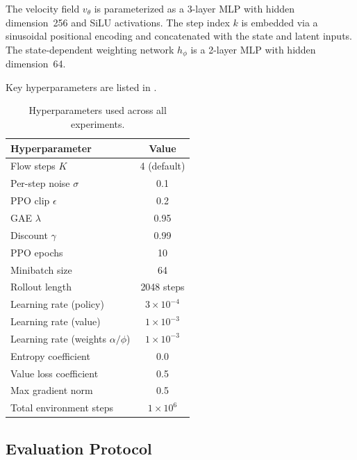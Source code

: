 The velocity field $v_\theta$ is parameterized as a 3-layer MLP with hidden
dimension~256 and SiLU activations.  The step index $k$ is embedded via a
sinusoidal positional encoding and concatenated with the state and latent
inputs.  The state-dependent weighting network $h_\phi$ is a 2-layer MLP with
hidden dimension~64.

Key hyperparameters are listed in .

\begin{table}[t]
  \centering
  \caption{Hyperparameters used across all experiments.}
  \label{tab:hyperparams}
  \begin{tabular}{@{}lc@{}}
    \toprule
    \textbf{Hyperparameter} & \textbf{Value} \\
    \midrule
    Flow steps $K$                  & 4 (default) \\
    Per-step noise $\sigma$         & 0.1 \\
    PPO clip $\epsilon$             & 0.2 \\
    GAE $\lambda$                   & 0.95 \\
    Discount $\gamma$               & 0.99 \\
    PPO epochs                      & 10 \\
    Minibatch size                  & 64 \\
    Rollout length                  & 2048 steps \\
    Learning rate (policy)          & $3 \times 10^{-4}$ \\
    Learning rate (value)           & $1 \times 10^{-3}$ \\
    Learning rate (weights $\alpha/\phi$) & $1 \times 10^{-3}$ \\
    Entropy coefficient             & 0.0 \\
    Value loss coefficient          & 0.5 \\
    Max gradient norm               & 0.5 \\
    Total environment steps         & $1 \times 10^{6}$ \\
    \bottomrule
  \end{tabular}
\end{table}

\subsection{Evaluation Protocol}
\label{sec:experiments:eval}

